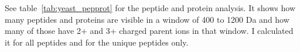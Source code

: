 %
%
%
%
%
%
%
%
%
%
%
%
%
%
%

See table~\ref{tab:yeast_pepprot} for the peptide and protein analysis. It
shows how many peptides and proteins are visible in a window of 400 to 1200 Da
and how many of those have 2+ and 3+ charged parent ions in that window. I
calculated it for all peptides and for the unique peptides only.

